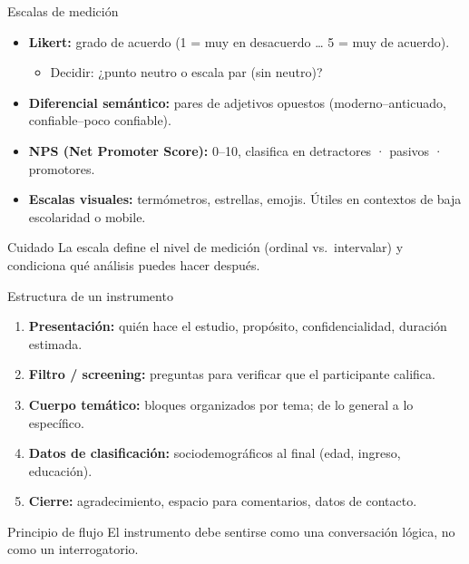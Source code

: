 \documentclass[aspectratio=169, 12pt]{beamer}
\begin{document}
\begin{frame}{Escalas de medición}
  \begin{itemize}
    \item \textbf{Likert:} grado de acuerdo (1 = muy en desacuerdo … 5 = muy de acuerdo).
    \begin{itemize}
      \item Decidir: ¿punto neutro o escala par (sin neutro)?
    \end{itemize}
    \item \textbf{Diferencial semántico:} pares de adjetivos opuestos (moderno–anticuado, confiable–poco confiable).
    \item \textbf{NPS (Net Promoter Score):} 0--10, clasifica en detractores · pasivos · promotores.
    \item \textbf{Escalas visuales:} termómetros, estrellas, emojis. Útiles en contextos de baja escolaridad o mobile.
  \end{itemize}
  \vspace{0.3cm}
  \begin{alertblock}{Cuidado}
    La escala define el nivel de medición (ordinal vs.\ intervalar) y condiciona qué análisis puedes hacer después.
  \end{alertblock}
\end{frame}

\begin{frame}{Estructura de un instrumento}
  \begin{enumerate}
    \item \textbf{Presentación:} quién hace el estudio, propósito, confidencialidad, duración estimada.
    \item \textbf{Filtro / screening:} preguntas para verificar que el participante califica.
    \item \textbf{Cuerpo temático:} bloques organizados por tema; de lo general a lo específico.
    \item \textbf{Datos de clasificación:} sociodemográficos al final (edad, ingreso, educación).
    \item \textbf{Cierre:} agradecimiento, espacio para comentarios, datos de contacto.
  \end{enumerate}
  \vspace{0.3cm}
  \begin{block}{Principio de flujo}
    El instrumento debe sentirse como una conversación lógica, no como un interrogatorio.
  \end{block}
\end{frame}
\end{document}
